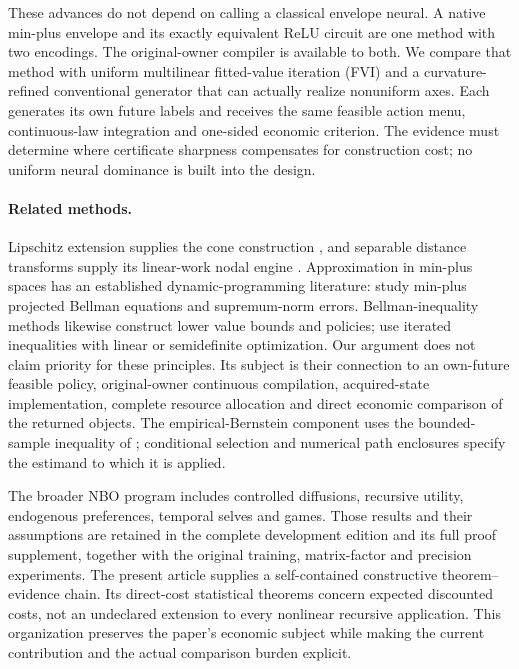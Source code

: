 \documentclass[ecta,nameyear,draft]{econsocart}
\begin{document}
These advances do not depend on calling a classical envelope neural. A native min-plus envelope and its exactly equivalent ReLU circuit are one method with two encodings. The original-owner compiler is available to both. We compare that method with uniform multilinear fitted-value iteration (FVI) and a curvature-refined conventional generator that can actually realize nonuniform axes. Each generates its own future labels and receives the same feasible action menu, continuous-law integration and one-sided economic criterion. The evidence must determine where certificate sharpness compensates for construction cost; no uniform neural dominance is built into the design.

\paragraph{Related methods.}
Lipschitz extension supplies the cone construction \citep{mcshane1934}, and separable distance transforms supply its linear-work nodal engine \citep{felzenszwalb2012}. Approximation in min-plus spaces has an established dynamic-programming literature: \citet{lakshminarayanan2014} study min-plus projected Bellman equations and supremum-norm errors. Bellman-inequality methods likewise construct lower value bounds and policies; \citet{wang2015} use iterated inequalities with linear or semidefinite optimization. Our argument does not claim priority for these principles. Its subject is their connection to an own-future feasible policy, original-owner continuous compilation, acquired-state implementation, complete resource allocation and direct economic comparison of the returned objects. The empirical-Bernstein component uses the bounded-sample inequality of \citet{maurer2009}; conditional selection and numerical path enclosures specify the estimand to which it is applied.

The broader NBO program includes controlled diffusions, recursive utility, endogenous preferences, temporal selves and games. Those results and their assumptions are retained in the complete development edition and its full proof supplement, together with the original training, matrix-factor and precision experiments. The present article supplies a self-contained constructive theorem--evidence chain. Its direct-cost statistical theorems concern expected discounted costs, not an undeclared extension to every nonlinear recursive application. This organization preserves the paper's economic subject while making the current contribution and the actual comparison burden explicit.
\end{document}

